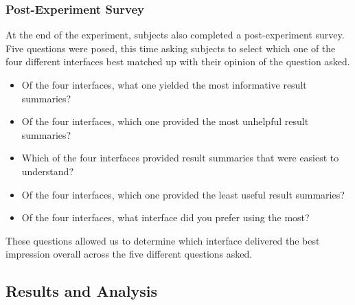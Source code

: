 \subsubsection{Post-Experiment Survey}
At the end of the experiment, subjects also completed a post-experiment survey. Five questions were posed, this time asking subjects to select which one of the four different interfaces best matched up with their opinion of the question asked.

\begin{itemize}
    \item{ Of the four interfaces, what one yielded the most informative result summaries?}
    \item{ Of the four interfaces, which one provided the most unhelpful result summaries?}
    \item{ Which of the four interfaces provided result summaries that were easiest to understand?}
    \item{ Of the four interfaces, which one provided the least useful result summaries?}
    \item{ Of the four interfaces, what interface did you prefer using the most?}
\end{itemize}

These questions allowed us to determine which interface delivered the best impression overall across the five different questions asked.

\subsection{Results and Analysis}\label{chap:snippets:user:results}




